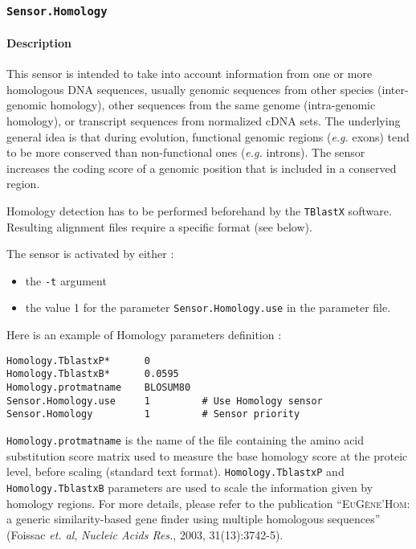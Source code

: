
\subsubsection{\texttt{Sensor.Homology}}

\paragraph{Description}

This sensor is intended to take into account information from one or
more homologous DNA sequences, usually genomic sequences from other
species (inter-genomic homology), other sequences from the same genome
(intra-genomic homology), or transcript sequences from normalized cDNA
sets. The underlying general idea is that during evolution, functional
genomic regions (\emph{e.g.} exons) tend to be more conserved than
non-functional ones (\emph{e.g.} introns). The sensor increases the
coding score of a genomic position that is included in a conserved
region.

Homology detection has to be performed beforehand by the
\texttt{TBlastX} software. Resulting alignment files require a
specific format (see below).

The sensor is activated by either :
\begin{itemize}
\item the \texttt{-t} argument 
\item the value 1 for the parameter \texttt{Sensor.Homology.use} in the
  parameter file.
\end{itemize}
Here is an example of Homology parameters definition :
\begin{Verbatim}[fontsize=\small]
Homology.TblastxP*      0
Homology.TblastxB*      0.0595
Homology.protmatname    BLOSUM80
Sensor.Homology.use     1         # Use Homology sensor
Sensor.Homology         1         # Sensor priority
\end{Verbatim}

\texttt{Homology.protmatname} is the name of the file containing the
amino acid substitution score matrix used to measure the base homology
score at the proteic level, before scaling (standard text format).
\texttt{Homology.TblastxP} and \texttt{Homology.TblastxB} parameters
are used to scale the information given by homology regions. For more
details, please refer to the publication ``\textsc{EuG\`ene'Hom}: a
generic similarity-based gene finder using multiple homologous
sequences'' (Foissac \emph{et. al}, \emph{Nucleic Acids Res.}, 2003,
31(13):3742-5).

